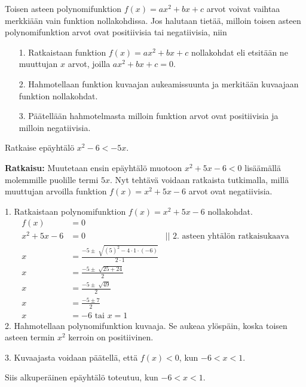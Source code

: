 Toisen asteen polynomifunktion $f(x)=ax^2+bx+c$ arvot voivat vaihtaa merkkiään vain funktion nollakohdissa. Jos halutaan tietää, milloin toisen asteen polynomifunktion arvot ovat positiivisia tai negatiivisia, niin
\begin{itemize}
\item[1.] Ratkaistaan funktion $f(x)=ax^2+bx+c$ nollakohdat eli etsitään ne muuttujan $x$ arvot, joilla $ax^2+bx+c=0$.
\item[2.] Hahmotellaan funktion kuvaajan aukeamissuunta ja merkitään kuvaajaan funktion nollakohdat.
\item[3.] Päätellään hahmotelmasta milloin funktion arvot ovat positiivisia ja milloin negatiivisia.
\end{itemize} 

\begin{esimerkki} 
Ratkaise epäyhtälö $x^2-6<-5x$.
 
\textbf{Ratkaisu:}
Muutetaan ensin epäyhtälö muotoon $x^2+5x-6<0$ lisäämällä molemmille puolille termi $5x$. Nyt tehtävä voidaan ratkaista tutkimalla, millä muuttujan arvoilla funktion $f(x)=x^2+5x-6$ arvot ovat negatiivisia.
 
1. Ratkaistaan polynomifunktion $f(x)=x^2+5x-6$ nollakohdat.
\begin{align*}
f(x)&=0 & \\
x^2+5x-6&=0 \ \  \ \ \ & || \text{ 2. asteen yhtälön ratkaisukaava} \\ 
x&=\frac{-5 \pm \sqrt[]{(5)^2-4 \cdot 1 \cdot(-6)}}{2 \cdot 1} & \\
x&=\frac{-5 \pm \sqrt[]{25+24}}{2} & \\
x&=\frac{-5 \pm \sqrt[]{49}}{2} & \\
x&=\frac{-5 \pm 7}{2} & \\
x&=-6 \text{ tai } x=1 &
\end{align*}
2. Hahmotellaan polynomifunktion kuvaaja. Se aukeaa ylöspäin, koska toisen
asteen termin $x^2$ kerroin on positiivinen.
 
\begin{lukusuora}{-2.5}{2.5}{5}
\end{lukusuora}
 
3.  Kuvaajasta voidaan päätellä, että $f(x)<0$, kun $-6 < x < 1$.
 
Siis alkuperäinen epäyhtälö toteutuu, kun $-6 < x <1$.  
\end{esimerkki}

